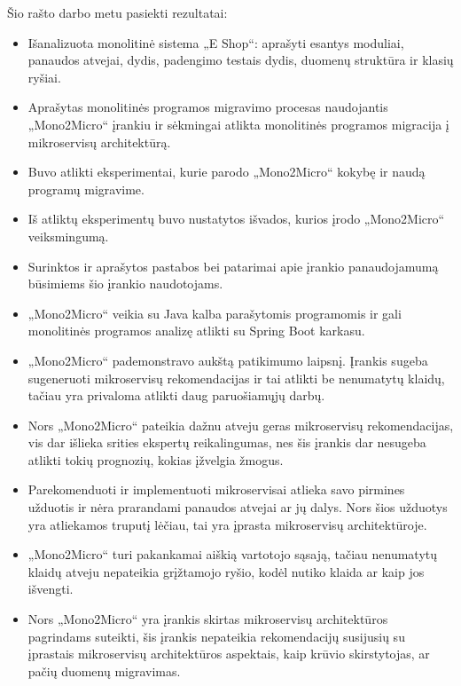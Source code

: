 \documentclass{VUMIFPSbakalaurinis}
\begin{document}
Šio rašto darbo metu pasiekti rezultatai:
\begin{itemize}
    \item Išanalizuota monolitinė sistema „E Shop“: aprašyti esantys moduliai, panaudos atvejai, dydis, padengimo testais dydis, duomenų struktūra ir klasių ryšiai.

    \item Aprašytas monolitinės programos migravimo procesas naudojantis „Mono2Micro“ įrankiu ir sėkmingai atlikta monolitinės programos migracija į mikroservisų architektūrą.

    \item Buvo atlikti eksperimentai, kurie parodo „Mono2Micro“ kokybę ir naudą programų migravime.

    \item Iš atliktų eksperimentų buvo nustatytos išvados, kurios įrodo „Mono2Micro“ veiksmingumą.

    \item Surinktos ir aprašytos pastabos bei patarimai apie įrankio panaudojamumą būsimiems šio įrankio naudotojams.
    
\end{itemize}

\begin{itemize}
    \item „Mono2Micro“ veikia su Java kalba parašytomis programomis ir gali monolitinės programos analizę atlikti su Spring Boot karkasu.

    \item „Mono2Micro“ pademonstravo aukštą patikimumo laipsnį. Įrankis sugeba sugeneruoti mikroservisų rekomendacijas ir tai atlikti be nenumatytų klaidų, tačiau yra privaloma atlikti daug paruošiamųjų darbų.

    \item Nors „Mono2Micro“ pateikia dažnu atveju geras mikroservisų rekomendacijas, vis dar išlieka srities ekspertų reikalingumas, nes šis įrankis dar nesugeba atlikti tokių prognozių, kokias įžvelgia žmogus.

    \item Parekomenduoti ir implementuoti mikroservisai atlieka savo pirmines užduotis ir nėra prarandami panaudos atvejai ar jų dalys. Nors šios užduotys yra atliekamos truputį lėčiau, tai yra įprasta mikroservisų architektūroje.

    \item „Mono2Micro“ turi pakankamai aiškią vartotojo sąsają, tačiau nenumatytų klaidų atveju nepateikia grįžtamojo ryšio, kodėl nutiko klaida ar kaip jos išvengti.

    \item Nors „Mono2Micro“ yra įrankis skirtas mikroservisų architektūros pagrindams suteikti, šis įrankis nepateikia rekomendacijų susijusių su įprastais mikroservisų architektūros aspektais, kaip krūvio skirstytojas, ar pačių duomenų migravimas.

\end{itemize}
\end{document}
